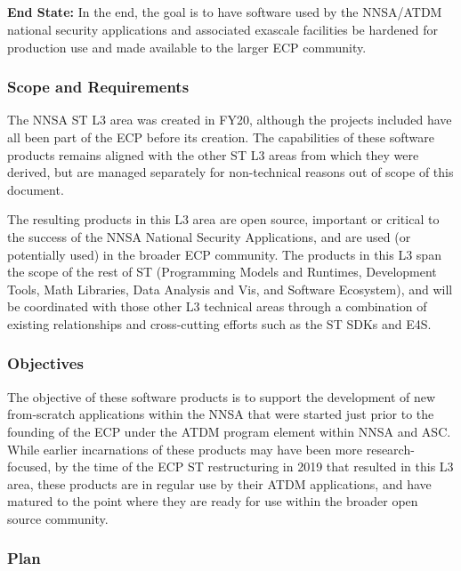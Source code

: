 \subsection{ \nnsa}\label{subsect:nnsa}

\textbf{End State:} In the end, the goal is to have software used by the NNSA/ATDM national security
applications and associated exascale facilities be hardened for
production use and made available to the larger ECP community.

\subsubsection{Scope and Requirements}
The NNSA ST L3 area was created in FY20, although the projects included
have all been part of the ECP before its creation. The capabilities of these
software products remains aligned with the other ST
L3 areas from which they were derived, but are managed separately for
non-technical reasons out of scope of this document.

The resulting products in this L3 area 
are open source, important or critical to the success of the NNSA
National Security Applications, and are used (or potentially used) in
the broader ECP community. The products in this L3 span the scope of
the rest of ST (Programming Models and Runtimes, Development Tools,
Math Libraries, Data Analysis and Vis, and Software Ecosystem), and
will be coordinated with those other L3 technical 
areas through a combination of existing relationships and
cross-cutting efforts such as the ST SDKs and E4S.  

\subsubsection{Objectives}

The objective of these software products is to support the
development of new from-scratch applications within the NNSA that were
started just prior to the founding of the ECP under the ATDM 
program element within NNSA and
ASC. While earlier incarnations of these products may have been more
research-focused, by the time of the ECP ST restructuring in 2019 that
resulted in this L3 area, these products are in regular use by their
ATDM applications, and have matured to the point where they are ready
for use within the broader open source community.

\subsubsection{Plan}


